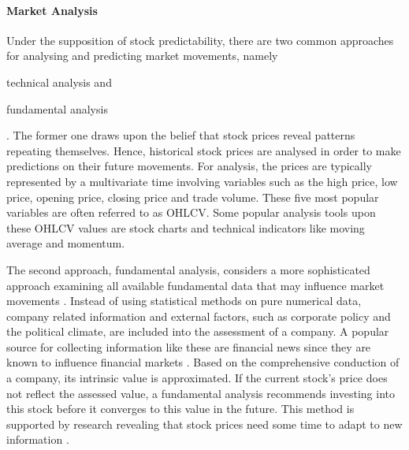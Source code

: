 \paragraph{Market Analysis}
Under the supposition of stock predictability, there are two common approaches for analysing and predicting market movements, namely \begin{enumerate*}[label=(\roman*)]
\item technical analysis and 
\item fundamental analysis
\end{enumerate*} \cite{KhadjehNassirtoussi2014TextReview}. The former one draws upon the belief that stock prices reveal patterns repeating themselves. Hence, historical stock prices are analysed in order to make predictions on their future movements. For analysis, the prices are typically represented by a multivariate time involving variables such as the high price, low price, opening price, closing price and trade volume. These five most popular variables are often referred to as OHLCV. Some popular analysis tools upon these OHLCV values are stock charts and technical indicators like moving average and momentum.

The second approach, fundamental analysis, considers a more sophisticated approach examining all available fundamental data that may influence market movements \cite{LopezdePrado2018AdvancesLearning}. Instead of using statistical methods on pure numerical data, company related information and external factors, such as corporate policy and the political climate, are included into the assessment of a company. A popular source for collecting information like these are financial news since they are known to influence financial markets \cite{Vlastakis2012InformationVolatility, KhadjehNassirtoussi2014TextReview}. Based on the comprehensive conduction of a company, its intrinsic value is approximated. If the current stock's price does not reflect the assessed value, a fundamental analysis recommends investing into this stock before it converges to this value in the future. This method is supported by research revealing that stock prices need some time to adapt to new information \cite{Hsu2016BridgingEconomists}.






